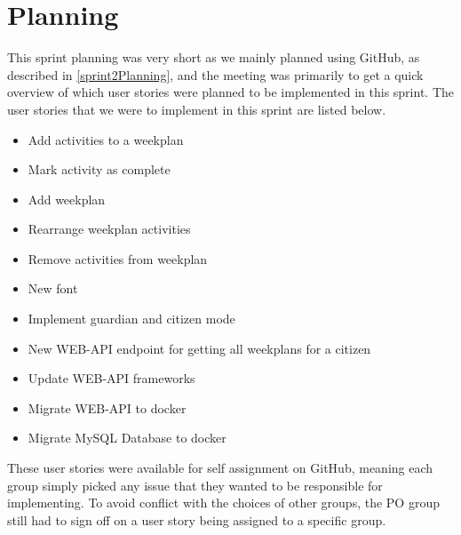 \section{Planning}
This sprint planning was very short as we mainly planned using GitHub, as described in \autoref{sprint2Planning}, and the meeting was primarily to get a quick overview of which user stories were planned to be implemented in this sprint.
The user stories that we were to implement in this sprint are listed below.

\begin{itemize}
  \item Add activities to a weekplan
  \item Mark activity as complete
  \item Add weekplan
  \item Rearrange weekplan activities
  \item Remove activities from weekplan
  \item New font
  \item Implement guardian and citizen mode
  \item New WEB-API endpoint for getting all weekplans for a citizen
  \item Update WEB-API frameworks
  \item Migrate WEB-API to docker
  \item Migrate MySQL Database to docker
\end{itemize}

These user stories were available for self assignment on GitHub, meaning each group simply picked any issue that they wanted to be responsible for implementing.
To avoid conflict with the choices of other groups, the PO group still had to sign off on a user story being assigned to a specific group.
